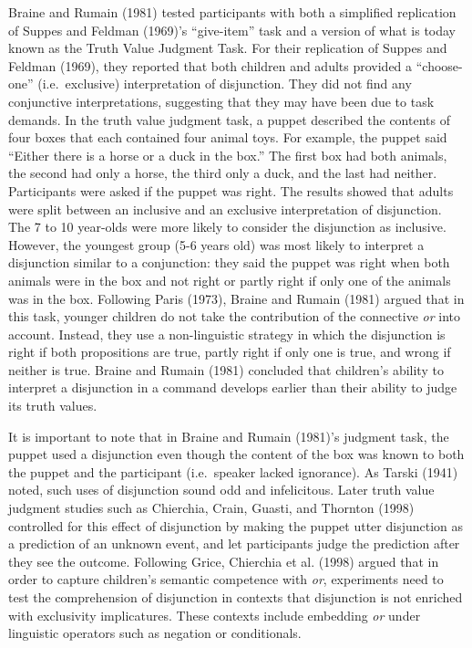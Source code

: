\documentclass[floatsintext,man]{apa6}
\theoremstyle{definition}
\theoremstyle{definition}
\theoremstyle{definition}
\theoremstyle{remark}
\begin{document}
Braine and Rumain (1981) tested participants with both a simplified
replication of Suppes and Feldman (1969)'s \enquote{give-item} task and
a version of what is today known as the Truth Value Judgment Task. For
their replication of Suppes and Feldman (1969), they reported that both
children and adults provided a \enquote{choose-one} (i.e.~exclusive)
interpretation of disjunction. They did not find any conjunctive
interpretations, suggesting that they may have been due to task demands.
In the truth value judgment task, a puppet described the contents of
four boxes that each contained four animal toys. For example, the puppet
said \enquote{Either there is a horse or a duck in the box.} The first
box had both animals, the second had only a horse, the third only a
duck, and the last had neither. Participants were asked if the puppet
was right. The results showed that adults were split between an
inclusive and an exclusive interpretation of disjunction. The 7 to 10
year-olds were more likely to consider the disjunction as inclusive.
However, the youngest group (5-6 years old) was most likely to interpret
a disjunction similar to a conjunction: they said the puppet was right
when both animals were in the box and not right or partly right if only
one of the animals was in the box. Following Paris (1973), Braine and
Rumain (1981) argued that in this task, younger children do not take the
contribution of the connective \emph{or} into account. Instead, they use
a non-linguistic strategy in which the disjunction is right if both
propositions are true, partly right if only one is true, and wrong if
neither is true. Braine and Rumain (1981) concluded that children's
ability to interpret a disjunction in a command develops earlier than
their ability to judge its truth values.

It is important to note that in Braine and Rumain (1981)'s judgment
task, the puppet used a disjunction even though the content of the box
was known to both the puppet and the participant (i.e.~speaker lacked
ignorance). As Tarski (1941) noted, such uses of disjunction sound odd
and infelicitous. Later truth value judgment studies such as Chierchia,
Crain, Guasti, and Thornton (1998) controlled for this effect of
disjunction by making the puppet utter disjunction as a prediction of an
unknown event, and let participants judge the prediction after they see
the outcome. Following Grice, Chierchia et al. (1998) argued that in
order to capture children's semantic competence with \emph{or},
experiments need to test the comprehension of disjunction in contexts
that disjunction is not enriched with exclusivity implicatures. These
contexts include embedding \emph{or} under linguistic operators such as
negation or conditionals.
\end{document}

